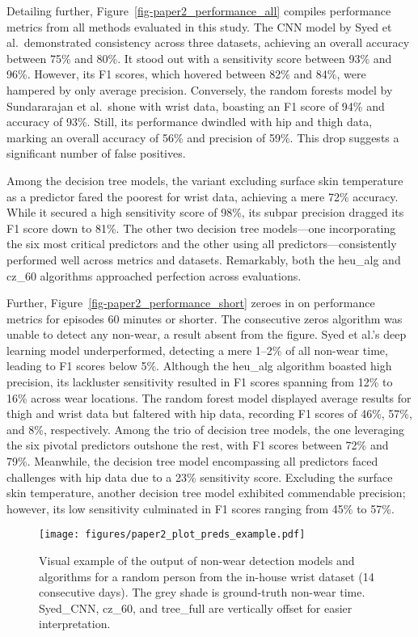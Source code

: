 \documentclass[
  10pt,
]{scrbook}
\begin{document}
Detailing further, Figure~\ref{fig-paper2_performance_all} compiles
performance metrics from all methods evaluated in this study. The CNN
model by Syed et al.~demonstrated consistency across three datasets,
achieving an overall accuracy between 75\% and 80\%. It stood out with a
sensitivity score between 93\% and 96\%. However, its F1 scores, which
hovered between 82\% and 84\%, were hampered by only average precision.
Conversely, the random forests model by Sundararajan et al.~shone with
wrist data, boasting an F1 score of 94\% and accuracy of 93\%. Still,
its performance dwindled with hip and thigh data, marking an overall
accuracy of 56\% and precision of 59\%. This drop suggests a significant
number of false positives.

Among the decision tree models, the variant excluding surface skin
temperature as a predictor fared the poorest for wrist data, achieving a
mere 72\% accuracy. While it secured a high sensitivity score of 98\%,
its subpar precision dragged its F1 score down to 81\%. The other two
decision tree models---one incorporating the six most critical
predictors and the other using all predictors---consistently performed
well across metrics and datasets. Remarkably, both the heu\_alg and
cz\_60 algorithms approached perfection across evaluations.

Further, Figure~\ref{fig-paper2_performance_short} zeroes in on
performance metrics for episodes 60 minutes or shorter. The consecutive
zeros algorithm was unable to detect any non-wear, a result absent from
the figure. Syed et al.'s deep learning model underperformed, detecting
a mere 1--2\% of all non-wear time, leading to F1 scores below 5\%.
Although the heu\_alg algorithm boasted high precision, its lackluster
sensitivity resulted in F1 scores spanning from 12\% to 16\% across wear
locations. The random forest model displayed average results for thigh
and wrist data but faltered with hip data, recording F1 scores of 46\%,
57\%, and 8\%, respectively. Among the trio of decision tree models, the
one leveraging the six pivotal predictors outshone the rest, with F1
scores between 72\% and 79\%. Meanwhile, the decision tree model
encompassing all predictors faced challenges with hip data due to a 23\%
sensitivity score. Excluding the surface skin temperature, another
decision tree model exhibited commendable precision; however, its low
sensitivity culminated in F1 scores ranging from 45\% to 57\%.

\begin{figure}

{\centering \texttt{[image: figures/paper2\_plot\_preds\_example.pdf]}

}

\caption{\label{fig-paper2_preds_ex}Visual example of the output of
non-wear detection models and algorithms for a random person from the
in-house wrist dataset (14 consecutive days). The grey shade is
ground-truth non-wear time. Syed\_CNN, cz\_60, and tree\_full are
vertically offset for easier interpretation.}

\end{figure}
\end{document}
